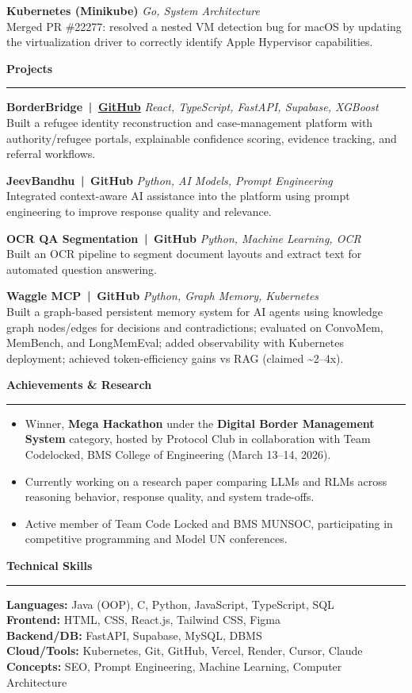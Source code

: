\documentclass[10pt,letterpaper]{article}
\newenvironment{tightitemize}{
  \begin{itemize}
    \setlength{\itemsep}{1pt}
    \setlength{\topsep}{2pt}
    \setlength{\parsep}{0pt}
    \setlength{\partopsep}{0pt}
    \setlength{\parskip}{0pt}
  }{
  \end{itemize}
}
\newcommand{\resumeProject}[3]{
  \textbf{#1} \hfill \textit{#2}\\
  #3
}
\newcommand{\resumeSection}[1]{
  \vspace{4pt}
  {\large\bfseries #1}\\[-2pt]
  \hrule
  \vspace{1pt}
}
\begin{document}
\resumeProject
  {Kubernetes (Minikube)}{Go, System Architecture}
  {Merged PR \#22277: resolved a nested VM detection bug for macOS by updating the virtualization driver to correctly identify Apple Hypervisor capabilities.}

\resumeSection{Projects}
\resumeProject
  {BorderBridge \,|\, \href{https://github.com/Abhigyan-Shekhar/public-static-void-main}{GitHub}}{React, TypeScript, FastAPI, Supabase, XGBoost}
  {Built a refugee identity reconstruction and case-management platform with authority/refugee portals, explainable confidence scoring, evidence tracking, and referral workflows.}

\resumeProject
  {JeevBandhu \,|\, GitHub}{Python, AI Models, Prompt Engineering}
  {Integrated context-aware AI assistance into the platform using prompt engineering to improve response quality and relevance.}

\resumeProject
  {OCR QA Segmentation \,|\, GitHub}{Python, Machine Learning, OCR}
  {Built an OCR pipeline to segment document layouts and extract text for automated question answering.}

\resumeProject
  {Waggle MCP \,|\, GitHub}{Python, Graph Memory, Kubernetes}
  {Built a graph-based persistent memory system for AI agents using knowledge graph nodes/edges for decisions and contradictions; evaluated on ConvoMem, MemBench, and LongMemEval; added observability with Kubernetes deployment; achieved token-efficiency gains vs RAG (claimed \textasciitilde2--4x).}

\resumeSection{Achievements \& Research}
\begin{tightitemize}
  \item Winner, \textbf{Mega Hackathon} under the \textbf{Digital Border Management System} category, hosted by Protocol Club in collaboration with Team Codelocked, BMS College of Engineering (March 13--14, 2026).
  \item Currently working on a research paper comparing LLMs and RLMs across reasoning behavior, response quality, and system trade-offs.
  \item Active member of Team Code Locked and BMS MUNSOC, participating in competitive programming and Model UN conferences.
\end{tightitemize}

\resumeSection{Technical Skills}
\textbf{Languages:} Java (OOP), C, Python, JavaScript, TypeScript, SQL \\
\textbf{Frontend:} HTML, CSS, React.js, Tailwind CSS, Figma \\
\textbf{Backend/DB:} FastAPI, Supabase, MySQL, DBMS \\
\textbf{Cloud/Tools:} Kubernetes, Git, GitHub, Vercel, Render, Cursor, Claude \\
\textbf{Concepts:} SEO, Prompt Engineering, Machine Learning, Computer Architecture
\end{document}
